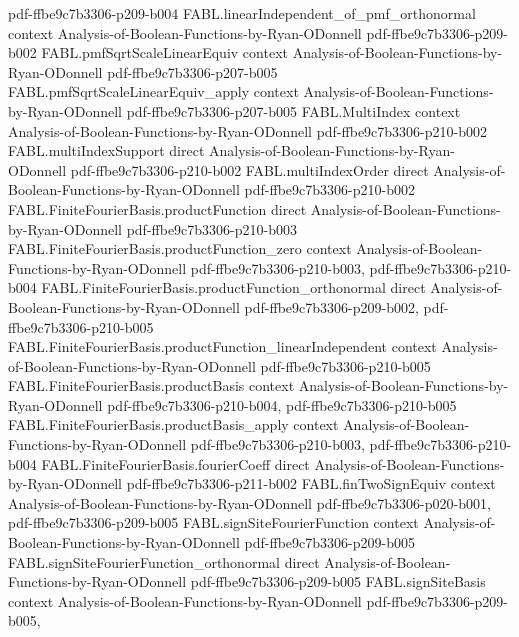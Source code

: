 \begin{theorem}
  {pdf-ffbe9c7b3306-p209-b004}
\proofstep
  {FABL.linearIndependent_of_pmf_orthonormal}
  {context}
  {Analysis-of-Boolean-Functions-by-Ryan-ODonnell}
  {pdf-ffbe9c7b3306-p209-b002}
\proofstep
  {FABL.pmfSqrtScaleLinearEquiv}
  {context}
  {Analysis-of-Boolean-Functions-by-Ryan-ODonnell}
  {pdf-ffbe9c7b3306-p207-b005}
\proofstep
  {FABL.pmfSqrtScaleLinearEquiv_apply}
  {context}
  {Analysis-of-Boolean-Functions-by-Ryan-ODonnell}
  {pdf-ffbe9c7b3306-p207-b005}
\proofstep
  {FABL.MultiIndex}
  {context}
  {Analysis-of-Boolean-Functions-by-Ryan-ODonnell}
  {pdf-ffbe9c7b3306-p210-b002}
\proofstep
  {FABL.multiIndexSupport}
  {direct}
  {Analysis-of-Boolean-Functions-by-Ryan-ODonnell}
  {pdf-ffbe9c7b3306-p210-b002}
\proofstep
  {FABL.multiIndexOrder}
  {direct}
  {Analysis-of-Boolean-Functions-by-Ryan-ODonnell}
  {pdf-ffbe9c7b3306-p210-b002}
\proofstep
  {FABL.FiniteFourierBasis.productFunction}
  {direct}
  {Analysis-of-Boolean-Functions-by-Ryan-ODonnell}
  {pdf-ffbe9c7b3306-p210-b003}
\proofstep
  {FABL.FiniteFourierBasis.productFunction_zero}
  {context}
  {Analysis-of-Boolean-Functions-by-Ryan-ODonnell}
  {pdf-ffbe9c7b3306-p210-b003,
    pdf-ffbe9c7b3306-p210-b004}
\proofstep
  {FABL.FiniteFourierBasis.productFunction_orthonormal}
  {direct}
  {Analysis-of-Boolean-Functions-by-Ryan-ODonnell}
  {pdf-ffbe9c7b3306-p209-b002,
    pdf-ffbe9c7b3306-p210-b005}
\proofstep
  {FABL.FiniteFourierBasis.productFunction_linearIndependent}
  {context}
  {Analysis-of-Boolean-Functions-by-Ryan-ODonnell}
  {pdf-ffbe9c7b3306-p210-b005}
\proofstep
  {FABL.FiniteFourierBasis.productBasis}
  {context}
  {Analysis-of-Boolean-Functions-by-Ryan-ODonnell}
  {pdf-ffbe9c7b3306-p210-b004,
    pdf-ffbe9c7b3306-p210-b005}
\proofstep
  {FABL.FiniteFourierBasis.productBasis_apply}
  {context}
  {Analysis-of-Boolean-Functions-by-Ryan-ODonnell}
  {pdf-ffbe9c7b3306-p210-b003,
    pdf-ffbe9c7b3306-p210-b004}
\proofstep
  {FABL.FiniteFourierBasis.fourierCoeff}
  {direct}
  {Analysis-of-Boolean-Functions-by-Ryan-ODonnell}
  {pdf-ffbe9c7b3306-p211-b002}
\proofstep
  {FABL.finTwoSignEquiv}
  {context}
  {Analysis-of-Boolean-Functions-by-Ryan-ODonnell}
  {pdf-ffbe9c7b3306-p020-b001,
    pdf-ffbe9c7b3306-p209-b005}
\proofstep
  {FABL.signSiteFourierFunction}
  {context}
  {Analysis-of-Boolean-Functions-by-Ryan-ODonnell}
  {pdf-ffbe9c7b3306-p209-b005}
\proofstep
  {FABL.signSiteFourierFunction_orthonormal}
  {direct}
  {Analysis-of-Boolean-Functions-by-Ryan-ODonnell}
  {pdf-ffbe9c7b3306-p209-b005}
\proofstep
  {FABL.signSiteBasis}
  {context}
  {Analysis-of-Boolean-Functions-by-Ryan-ODonnell}
  {pdf-ffbe9c7b3306-p209-b005,
}
\end{theorem}
